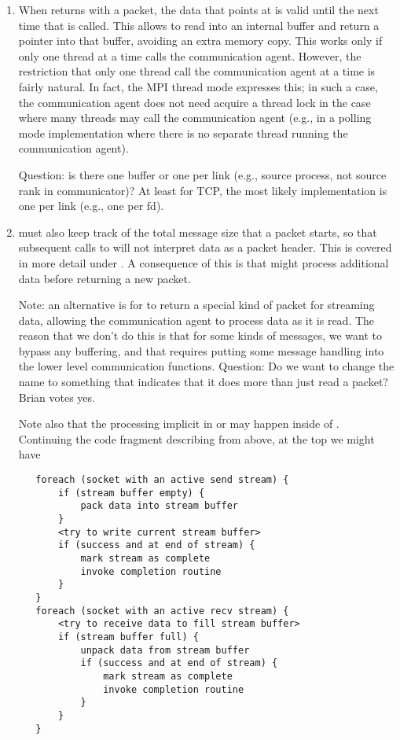 \begin{enumerate}
\item When  returns with a packet, the data that
   points at is valid until the next time that
   is called.  This allows
   to read 
  into an internal buffer and return a pointer into that buffer, avoiding an
  extra memory copy.  This works only if only one thread at a time calls the
  communication agent.  However, the restriction that only one thread call the
  communication agent at a time is fairly natural.  In fact, the MPI thread
  mode  expresses this; in such a case, the
  communication agent does not need acquire a thread lock in the case where
  many threads may call the communication agent (e.g., in a polling mode
  implementation where there is no separate thread running the communication
  agent).  

  Question: is there one buffer or one per link (e.g., source process, not
  source rank in communicator)?  At least for TCP, the most likely
  implementation is one per link (e.g., one per fd).

\item {} must also keep track of the total message
  size that 
  a packet starts, so that subsequent calls to  will
  not 
  interpret data as a packet header.  This is covered in more detail under
  .  A consequence of this is that
   might process additional data before returning a
  new packet.

  Note: an alternative is for  to return a special
  kind of packet for streaming data, allowing the communication agent to
  process data as it is read.  The reason that we don't do this is that for
  some kinds of messages, we want to bypass any buffering, and that requires
  putting some message handling into the lower level communication functions.
  Question: Do we want to change the name to something that indicates that it
  does more than just read a packet?  Brian votes yes.

  Note also that the processing implicit in  or
   may happen inside of
  .  Continuing the code fragment describing
   from above, at the top we might have
\begin{verbatim}
   foreach (socket with an active send stream) {
       if (stream buffer empty) {
           pack data into stream buffer
       }
       <try to write current stream buffer>
       if (success and at end of stream) {
           mark stream as complete
           invoke completion routine
       }
   }
   foreach (socket with an active recv stream) {
       <try to receive data to fill stream buffer>
       if (stream buffer full) {
           unpack data from stream buffer
           if (success and at end of stream) {
               mark stream as complete
               invoke completion routine
           }
       }
   }
\end{verbatim}



\end{enumerate}
